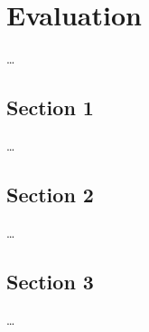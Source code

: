 






\chapter{Evaluation}
\label{ch:Evaluation}

\dots


\section{Section 1}
\label{ch:Evaluation:sec:Section1}

\dots


\section{Section 2}
\label{ch:Evaluation:sec:Section2}

\dots


\section{Section 3}
\label{ch:Evaluation:sec:Section3}

\dots